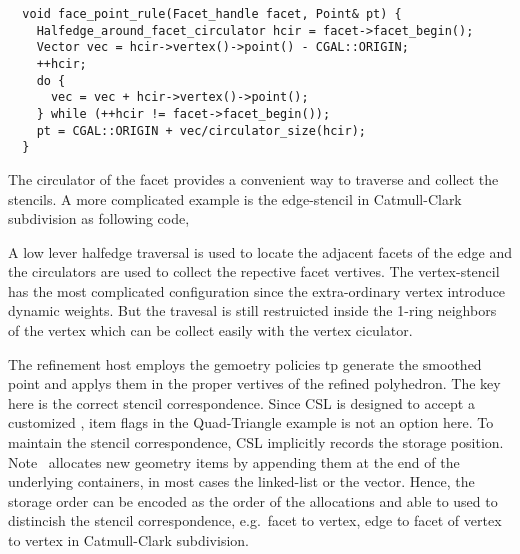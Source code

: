 \begin{lstlisting}
  void face_point_rule(Facet_handle facet, Point& pt) {
    Halfedge_around_facet_circulator hcir = facet->facet_begin();
    Vector vec = hcir->vertex()->point() - CGAL::ORIGIN;
    ++hcir;
    do {
      vec = vec + hcir->vertex()->point();
    } while (++hcir != facet->facet_begin());
    pt = CGAL::ORIGIN + vec/circulator_size(hcir);
  }
\end{lstlisting}

The circulator of the facet provides a convenient way to
traverse and collect the stencils. A more complicated
example is the edge-stencil in Catmull-Clark 
subdivision as following code,

A low lever halfedge traversal is used to locate the
adjacent facets of the edge and the circulators are used
to collect the repective facet vertives. The vertex-stencil
has the most complicated configuration since the
extra-ordinary vertex introduce dynamic weights. But the travesal
is still restruicted inside the 1-ring neighbors of the vertex
which can be collect easily with the vertex ciculator.

The refinement host employs the gemoetry policies
tp generate the smoothed point and applys them in the
proper vertives of the refined polyhedron. The key here is 
the correct stencil correspondence. Since CSL is designed
to accept a customized \cgalpoly , item flags in the 
Quad-Triangle example is not an option here.
To maintain the stencil correspondence, CSL implicitly
records the storage position. Note \cgalpoly\ allocates new
geometry items by appending them at the end of the underlying
containers, in most cases the linked-list or the vector.
Hence, the storage order can be encoded as the order of
the allocations and able to used to distincish the
stencil correspondence, e.g.\ facet to vertex, edge to facet
of vertex to vertex in Catmull-Clark subdivision.

